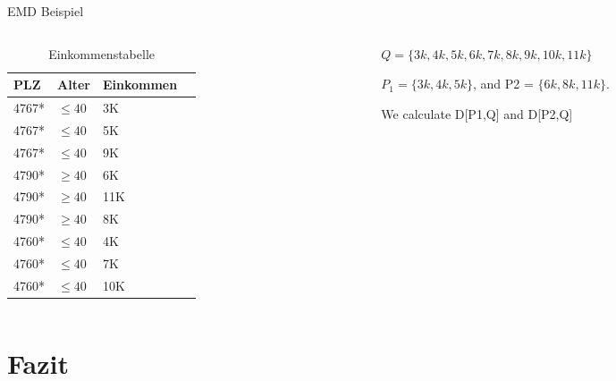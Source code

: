 \begin{frame}{EMD Beispiel}
	
	\begin{columns}[T]
		\begin{column}{0.5\textwidth}
			\begin{table}[]
				\centering
				\label{tclossenessExample}
				\begin{tabular}{|l|l|l|l}
					\hline
					\textbf{PLZ}   & \textbf{Alter}    & \textbf{Einkommen} \\\hline
					4767* & $\le 40$ & 3K \\
					4767* & $\le 40$ & 5K \\
					4767* & $\le 40$ & 9K \\\hline
					4790* & $\ge 40$ & 6K \\
					4790* & $\ge 40$ & 11K \\
					4790* & $\ge 40$ & 8K \\\hline
					4760* & $\le 40$ & 4K \\
					4760* & $\le 40$ & 7K \\
					4760* & $\le 40$ & 10K \\\hline
				\end{tabular}
				\caption{Einkommenstabelle}
			\end{table}
		\end{column}
		
		\begin{column}{0.5\textwidth}
			$Q = \{3k, 4k, 5k, 6k, 7k, 8k, 9k, 10k, 11k\}$
			
			$P_1 = \{3k, 4k, 5k\}$, and P2 = \(\{6k, 8k, 11k\}\). 
			
			We calculate
			D[P1,Q] and D[P2,Q]
		\end{column}
	\end{columns}
\end{frame}


\section{Fazit}

